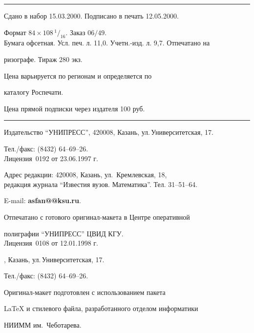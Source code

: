 \bigskip 


\hrule 


\setlength{\hoffset}{-23mm}


\bigskip


\noindent Сдано в набор 15.03.2000. Подписано в печать 12.05.2000.


Формат $84\times 108 \,^1/_{16}.$ Заказ $06/49$.\\


Бумага офсетная. Усл. печ. л. 11,0. Учетн.-изд. л. 9,7. Отпечатано на 


ризографе. Тираж $280$ экз. 





\noindent Цена варьируется по регионам и определяется по 


каталогу Роспечати. 





\noindent Цена прямой подписки через издателя 100 руб. 


\bigskip


\hrule


\bigskip


\noindent Издательство ``УНИПРЕСС'', 420008, Казань, ул.\,Университетская, 17.


Тел./факс: (8432) 64--69--26.\\


Лицензия \No\,0192 от 23.06.1997 г.


\smallskip





\noindent Адрес редакции: 420008, Казань, ул.~Кремлевская, 18,\\  


редакция журнала  ``Известия вузов. Математика''. Тел. 31--51--64.





\noindent E-mail: {\bf asfan@@ksu.ru}. \par


\bigskip 


\noindent Отпечатано с готового оригинал-макета в Центре оперативной


полиграфии ``УНИПРЕСС'' ЦВИД КГУ. \\


Лицензия \No\,0108 от 12.01.1998 г.





, Казань, ул.\,Университетская, 17.


Тел./факс: (8432) 64--69--26. \par


\bigskip


\noindent Оригинал-макет подготовлен с использованием пакета


\AmS\LaTeX{} и стилевого файла, разработанного отделом информатики


НИИММ им.~Чеботарева.








